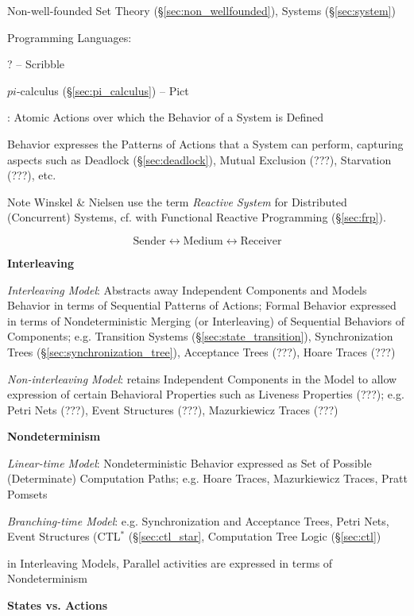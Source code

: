 Non-well-founded Set Theory (\S\ref{sec:non_wellfounded}), Systems
(\S\ref{sec:system})


\asterism

Programming Languages:

? -- Scribble

$pi$-calculus (\S\ref{sec:pi_calculus}) -- Pict


\asterism


\cite{winskel-nielsen93}: Atomic Actions over which the Behavior of a
System is Defined %

Behavior expresses the Patterns of Actions that a System can perform,
capturing aspects such as Deadlock (\S\ref{sec:deadlock}), Mutual
Exclusion (???), Starvation (???), etc.

\fist Note Winskel \& Nielsen \cite{winskel-nielsen93} use the term
\emph{Reactive System} for Distributed (Concurrent) Systems, cf. with
Functional Reactive Programming (\S\ref{sec:frp}).

\[
  \text{Sender} \leftrightarrow \text{Medium}
    \leftrightarrow \text{Receiver}
\]


\textbf{Interleaving}

\emph{Interleaving Model}: Abstracts away Independent Components and
Models Behavior in terms of Sequential Patterns of Actions; Formal
Behavior expressed in terms of Nondeterministic Merging (or
Interleaving) of Sequential Behaviors of Components; e.g. Transition
Systems (\S\ref{sec:state_transition}), Synchronization Trees
(\S\ref{sec:synchronization_tree}), Acceptance Trees (???), Hoare
Traces (???) %

\emph{Non-interleaving Model}: retains Independent Components in the
Model to allow expression of certain Behavioral Properties such as
Liveness Properties (???); e.g. Petri Nets (???), Event Structures
(???), Mazurkiewicz Traces (???)


\textbf{Nondeterminism}

\emph{Linear-time Model}: Nondeterministic Behavior expressed as Set of
Possible (Determinate) Computation Paths; e.g. Hoare Traces,
Mazurkiewicz Traces, Pratt Pomsets

\emph{Branching-time Model}: e.g. Synchronization and Acceptance
Trees, Petri Nets, Event Structures (CTL$^*$ (\S\ref{sec:ctl_star},
Computation Tree Logic (\S\ref{sec:ctl})


in Interleaving Models, Parallel activities are expressed in terms of
Nondeterminism


\textbf{States vs. Actions}

